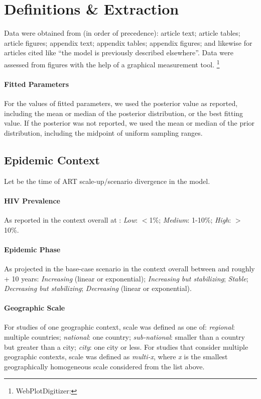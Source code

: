 \section{Definitions \& Extraction}
\label{a:defs}
Data were obtained from (in order of precedence):
article text; article tables; article figures; appendix text; appendix tables; appendix figures;
and likewise for articles cited like ``the model is previously described elsewhere''.
Data were assessed from figures with the help of a graphical measurement tool.%
\footnote{WebPlotDigitizer: }
\paragraph{Fitted Parameters}
For the values of fitted parameters, we used the posterior value as reported, including
the mean or median of the posterior distribution, or the best fitting value.
If the posterior was not reported, we used the mean or median of the prior distribution,
including the midpoint of uniform sampling ranges.
\subsection{Epidemic Context}
\label{aa:defs:context}
Let  be the time of ART scale-up/scenario divergence in the model.
\paragraph{HIV Prevalence}
As reported in the context overall at :
\emph{Low}: {$<$1\%}; \emph{Medium}: {1-10\%}; \emph{High}: {$>$10\%}.
\paragraph{Epidemic Phase}
As projected in the base-case scenario in the context overall between  and roughly  + 10 years:
\emph{Increasing} (linear or exponential);
\emph{Increasing but stabilizing};
\emph{Stable};
\emph{Decreasing but stabilizing};
\emph{Decreasing} (linear or exponential).
\paragraph{Geographic Scale}
For studies of one geographic context, scale was defined as one of:
\emph{regional}: multiple countries;
\emph{national}: one country;
\emph{sub-national}: smaller than a country but greater than a city;
\emph{city}: one city or less.
For studies that consider multiple geographic contexts, scale was defined as \emph{multi-x},
where \emph{x} is the smallest geographically homogeneous scale considered
from the list above.
